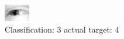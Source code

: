 \begin{figure}[h!]
\begin{center}
\includegraphics[width=0.60\columnwidth]{figures/ID2484_class_3_target_4.png}
\end{center}
\caption{ Classification: 3 actual target: 4}
\label{fig:ID2484_class_3_target_4}
\end{figure}
